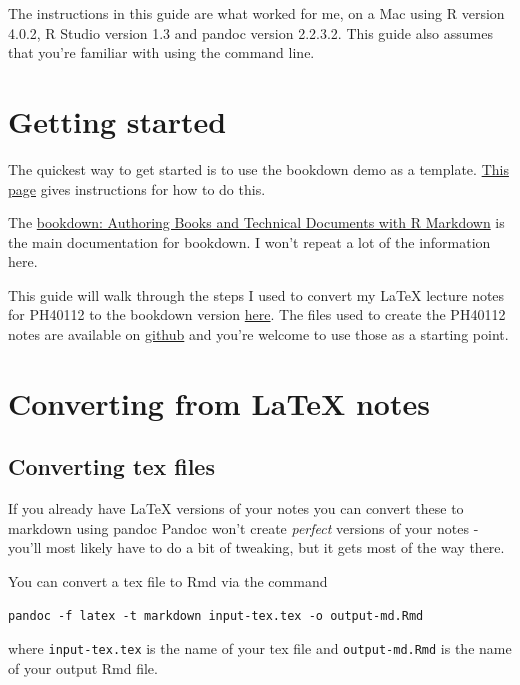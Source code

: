 \documentclass[]{book}
\begin{document}
The instructions in this guide are what worked for me, on a Mac using R version 4.0.2, R Studio version 1.3 and pandoc version 2.2.3.2. This guide also assumes that you're familiar with using the command line.

\hypertarget{getting-started}{%
\chapter{Getting started}\label{getting-started}}

The quickest way to get started is to use the bookdown demo as a template. \href{https://bookdown.org/yihui/bookdown/get-started.html}{This page} gives instructions for how to do this.

The \href{https://bookdown.org/yihui/bookdown/}{bookdown: Authoring Books and Technical Documents with R Markdown} is the main documentation for bookdown. I won't repeat a lot of the information here.

This guide will walk through the steps I used to convert my LaTeX lecture notes for PH40112 to the bookdown version \href{https://vickyscowcroft.github.io/PH40112_rmd/}{here}. The files used to create the PH40112 notes are available on \href{https://github.com/vickyscowcroft/PH40112_rmd}{github} and you're welcome to use those as a starting point.

\hypertarget{convert-latex}{%
\chapter{Converting from LaTeX notes}\label{convert-latex}}

\hypertarget{sec:con-tex}{%
\section{Converting tex files}\label{sec:con-tex}}

If you already have LaTeX versions of your notes you can convert these to markdown using pandoc Pandoc won't create \emph{perfect} versions of your notes - you'll most likely have to do a bit of tweaking, but it gets most of the way there.

You can convert a tex file to Rmd via the command

\begin{verbatim}
pandoc -f latex -t markdown input-tex.tex -o output-md.Rmd
\end{verbatim}

where \texttt{input-tex.tex} is the name of your tex file and \texttt{output-md.Rmd} is the name of your output Rmd file.
\end{document}
